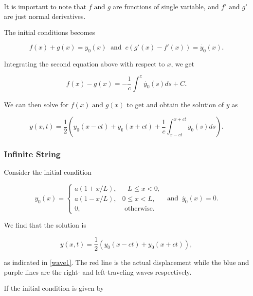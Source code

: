 \documentclass[a4paper,12pt]{report}
\begin{document}
It is important to note that \(f \text { and } g\) are functions of single variable, and \(f' \text { and } g'\) are just normal derivatives. 

The initial conditions becomes 

\begin{equation}
	f(x)+g(x) = y_0 (x) ~\text { and }~ c\left(g'(x) - f'(x)\right) = \dot{y_0 }(x).
\end{equation}

Integrating the second equation above with respect to \(x\), we get 

\begin{equation}
	f(x) - g(x) = - \frac{1}{c}\int_{}^{x} \dot{y_0 }(s)ds + C.
\end{equation}

We can then solve for \(f(x) \text { and } g(x)\) to get and obtain the solution of \(y\) as 

\begin{equation}
	y(x,t) = \frac{1}{2}\left( y_0 (x-ct) + y_0 (x+ct) + \frac{1}{c} \int_{x-ct}^{x+ct} \dot{y_0 }(s)ds    \right).
\end{equation}

\subsubsection{Infinite String}

Consider the initial condition 

\begin{equation}
	y_0 (x) = \begin{cases} a\left(1+x /L \right),& -L \le x < 0, \\ a\left(1-x /L \right),& 0 \le x < L, \\ 0,& \text{ otherwise}. \end{cases} ~\text { and }~ \dot{y_0} (x) = 0.   
\end{equation}

We find that the solution is 

\begin{equation}
	y(x,t) = \frac{1}{2}(y_0 (x-ct)+y_0 (x+ct)), 
\end{equation}

as indicated in \cref{wave1}. The red line is the actual displacement while the blue and purple lines are the right- and left-traveling waves respectively.


If the initial condition is given by 
\end{document}
